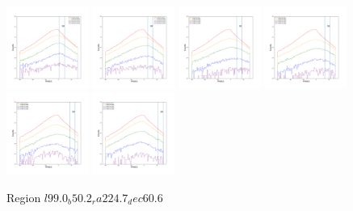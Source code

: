 \documentclass[12pt,prd]{article}
\begin{document}
\begin{figure}[h!]
\includegraphics[width=0.24\textwidth]{../figures/scanning_plotsgaiascan_l99_0_b50_2_ra224_7_dec60_6_npy_12.pdf}
\includegraphics[width=0.24\textwidth]{../figures/scanning_plotsgaiascan_l99_0_b50_2_ra224_7_dec60_6_npy_13.pdf}
\includegraphics[width=0.24\textwidth]{../figures/scanning_plotsgaiascan_l99_0_b50_2_ra224_7_dec60_6_npy_14.pdf}
\includegraphics[width=0.24\textwidth]{../figures/scanning_plotsgaiascan_l99_0_b50_2_ra224_7_dec60_6_npy_15.pdf}
\includegraphics[width=0.24\textwidth]{../figures/scanning_plotsgaiascan_l99_0_b50_2_ra224_7_dec60_6_npy_16.pdf}
\includegraphics[width=0.24\textwidth]{../figures/scanning_plotsgaiascan_l99_0_b50_2_ra224_7_dec60_6_npy_17.pdf}
\caption{Region $l99.0_b50.2_ra224.7_dec60.6$}
\end{figure}
\end{document}
